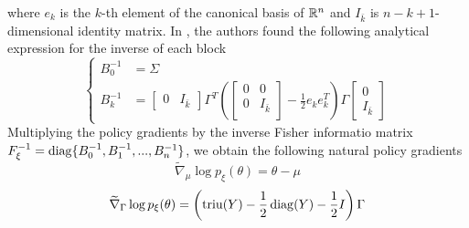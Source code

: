 where $e_k$ is the $k$-th element of the canonical basis of $\mathbb{R}^n$ and $I_{\bar{k}}$ is $n - k + 1$-dimensional identity matrix. In \cite{akimoto2010bidirectional}, the authors found the following analytical expression for the inverse of each block
\begin{equation*}
	\begin{cases}
		B_0^{-1} &= \Sigma\\	
		B_k^{-1} &= \begin{bmatrix}
				0 & I_{\bar{k}}
		\end{bmatrix} \Gamma^T \left(\begin{bmatrix}
			0 & 0 \\
			0 & I_{\bar{k}}\\
		\end{bmatrix}   -\frac{1}{2} e_k e_k^T\right) \Gamma \begin{bmatrix}
						0 \\ I_{\bar{k}}
				\end{bmatrix}
	\end{cases}
\end{equation*}
Multiplying the policy gradients by the inverse Fisher informatio matrix $F_\xi^{-1} = \operatorname{diag}\{B_0^{-1}, B_1^{-1}, ..., B_n^{-1}\}$, we obtain the following natural policy gradients
\begin{equation}
	\widetilde{\nabla}_\mu \log p_\xi(\theta) = \theta - \mu
\end{equation}
\begin{equation}
	\widetilde{\nabla}_\Gamma \log p_\xi(\theta) = \left(\operatorname{triu}(Y) - \frac{1}{2} \operatorname{diag}(Y) - \frac{1}{2} I \right) \Gamma
\end{equation}

